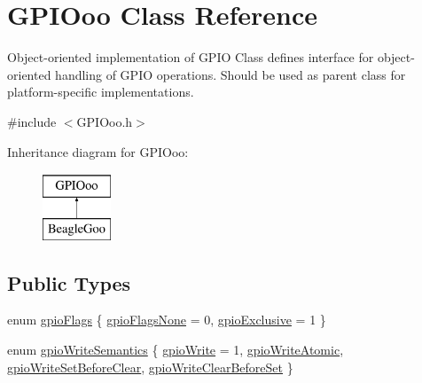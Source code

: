 \hypertarget{class_g_p_i_ooo}{\section{G\-P\-I\-Ooo Class Reference}
\label{class_g_p_i_ooo}
}


Object-\/oriented implementation of G\-P\-I\-O Class defines interface for object-\/oriented handling of G\-P\-I\-O operations. Should be used as parent class for platform-\/specific implementations.  




{\ttfamily \#include $<$G\-P\-I\-Ooo.\-h$>$}

Inheritance diagram for G\-P\-I\-Ooo\-:\begin{figure}[H]
\begin{center}
\leavevmode
\includegraphics[height=2.000000cm]{class_g_p_i_ooo}
\end{center}
\end{figure}
\subsection*{Public Types}
\begin{DoxyCompactItemize}
\item 
enum \hyperlink{class_g_p_i_ooo_a63b72558d40ed7f3ccc0c6f11d1e3b10}{gpio\-Flags} \{ \hyperlink{class_g_p_i_ooo_a63b72558d40ed7f3ccc0c6f11d1e3b10aa64ecca268265aa77389ee957e01fd63}{gpio\-Flags\-None} = 0, 
\hyperlink{class_g_p_i_ooo_a63b72558d40ed7f3ccc0c6f11d1e3b10a42607c5a4f579963b6426f81d2266c62}{gpio\-Exclusive} = 1
 \}
\item 
enum \hyperlink{class_g_p_i_ooo_ad4b133662b68989435bcd422feb0fc03}{gpio\-Write\-Semantics} \{ \hyperlink{class_g_p_i_ooo_ad4b133662b68989435bcd422feb0fc03a21aadd48a3896150795cd7fde8c93969}{gpio\-Write} = 1, 
\hyperlink{class_g_p_i_ooo_ad4b133662b68989435bcd422feb0fc03a359f92e59dfc786c8eb730a95179fd1b}{gpio\-Write\-Atomic}, 
\hyperlink{class_g_p_i_ooo_ad4b133662b68989435bcd422feb0fc03a551b9df4fca015828bfdfbce0e4e9c31}{gpio\-Write\-Set\-Before\-Clear}, 
\hyperlink{class_g_p_i_ooo_ad4b133662b68989435bcd422feb0fc03a4b8a43356457a0d5e5994ab8f1341a7f}{gpio\-Write\-Clear\-Before\-Set}
 \}
\end{DoxyCompactItemize}
